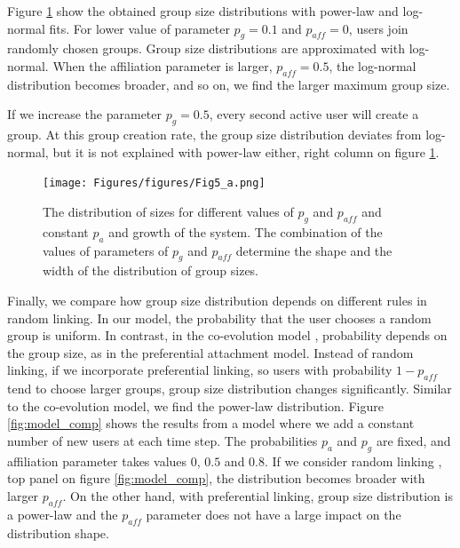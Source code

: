 Figure \ref{fig:n30} show the obtained group size distributions with power-law and log-normal fits. For lower value of parameter $p_g=0.1$ and $p_{aff}=0$, users join randomly chosen groups. Group size distributions are approximated with log-normal. When the affiliation parameter is larger, $p_{aff}=0.5$, the log-normal distribution becomes broader, and so on, we find the larger maximum group size. 

If we increase the parameter $p_g=0.5$, every second active user will create a group. At this group creation rate, the group size distribution deviates from log-normal, but it is not explained with power-law either, right column on figure \ref{fig:n30}.

\begin{figure}[!ht]
	\centering
	\texttt{[image: Figures/figures/Fig5\_a.png]}
	\caption{The distribution of sizes for different values of $p_{g}$ and $p_{aff}$ and constant $p_{a}$ and growth of the system. The combination of the values of parameters of $p_{g}$ and $p_{aff}$ determine the shape and the width of the distribution of group sizes. }
	\label{fig:n30}
\end{figure}

Finally, we compare how group size distribution depends on different rules in random linking. In our model, the probability that the user chooses a random group is uniform. In contrast, in the co-evolution model \cite{zheleva2009co}, probability depends on the group size, as in the preferential attachment model. Instead of random linking, if we incorporate preferential linking, so users with probability $1-p_{aff}$ tend to choose larger groups, group size distribution changes significantly. Similar to the co-evolution model, we find the power-law distribution. Figure \ref{fig:model_comp} shows the results from a model where we add a constant number of new users at each time step. The probabilities $p_a$ and $p_g$ are fixed, and affiliation parameter takes values $0$, $0.5$ and $0.8$. If we consider random linking , top panel on figure \ref{fig:model_comp}, the distribution becomes broader with larger $p_{aff}$. On the other hand, with preferential linking, group size distribution is a power-law and the $p_{aff}$ parameter does not have a large impact on the distribution shape.    

